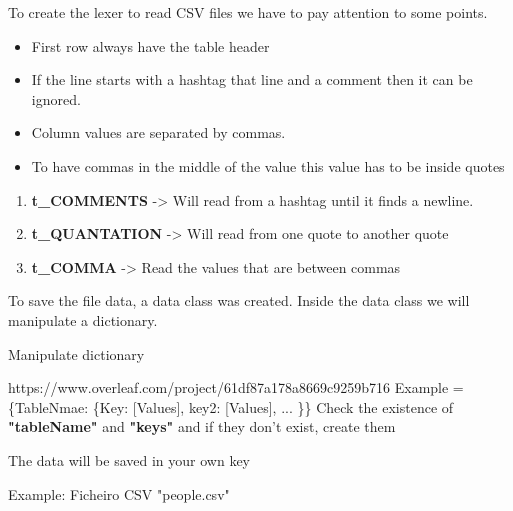 \documentclass{article}
\begin{document}
\vspace{0.5CM}

\setlength{\parindent}{10ex} 
To create the lexer to read CSV files we have to pay attention to some points.
\vspace{0.5CM}
\begin{itemize}
\item  First row always have the table header
\item  If the line starts with a hashtag that line and a comment then it can be ignored.
\item  Column values are separated by commas.
\item To have commas in the middle of the value this value has to be inside quotes

\vspace{0.5CM}
\end{itemize}

\begin{enumerate}
\item \textbf{t\_COMMENTS} -> Will read from a hashtag until it finds a newline.
\item \textbf{t\_QUANTATION} -> Will read from one quote to another quote
\item \textbf{t\_COMMA} ->  Read the values that are between commas
\end{enumerate}

\vspace{0.5CM}

\setlength{\parindent}{10ex} 
To save the file data, a data class was created. Inside the data class we will manipulate a dictionary.
\vspace{0.5CM}

\setlength{\parindent}{10ex} 
Manipulate dictionary \par
\vspace{0.5cm}https://www.overleaf.com/project/61df87a178a8669c9259b716
\noindent Example = \{TableNmae: \{Key: [Values], key2: [Values], ... \}\} 
\vspace{0.5cm}
Check the existence of \textbf{"tableName"} and \textbf{"keys"} and if they don't exist, create them

\vspace{0.5cm}
\setlength{\parindent}{10ex} 
The data will be saved in your own key \par

\vspace{1.0cm}
\noindent
Example: Ficheiro CSV  "people.csv"
\vspace{0.5cm}
\end{document}
